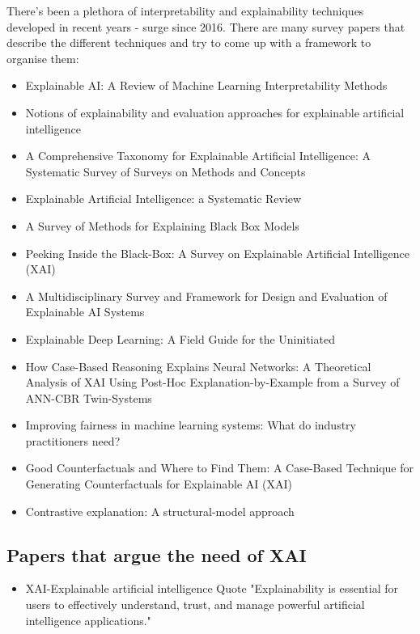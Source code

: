 \documentclass[manuscript,screen,review]{acmart}
\begin{document}
There's been a plethora of interpretability and explainability techniques developed in recent years - surge since 2016. There are many survey papers that describe the different techniques and try to come up with a framework to organise them:
\begin{itemize}
    \item Explainable AI: A Review of Machine Learning Interpretability Methods\cite{Linardatos2021}
    \item Notions of explainability and evaluation approaches for explainable artificial intelligence\cite{Vilone2021}
    \item A Comprehensive Taxonomy for Explainable Artificial Intelligence: A Systematic Survey of Surveys on Methods and Concepts\cite{Schwalbe2021}
    \item Explainable Artificial Intelligence: a Systematic Review\cite{Vilone2020}
    \item A Survey of Methods for Explaining Black Box Models\cite{Guidotti2018a}
    \item Peeking Inside the Black-Box: A Survey on Explainable Artificial Intelligence (XAI)\cite{Adadi2018}
    \item A Multidisciplinary Survey and Framework for Design and Evaluation of Explainable AI Systems\cite{Mohseni2021}
    \item Explainable Deep Learning: A Field Guide for the Uninitiated\cite{Ras2020}
    \item How Case-Based Reasoning Explains Neural Networks: A Theoretical Analysis of XAI Using Post-Hoc Explanation-by-Example from a Survey of ANN-CBR Twin-Systems\cite{Keane2019}
    \item Improving fairness in machine learning systems: What do industry practitioners need?\cite{Holstein2019}
    \item Good Counterfactuals and Where to Find Them: A Case-Based Technique for Generating Counterfactuals for Explainable AI (XAI)\cite{Keane2020} 
    \item Contrastive explanation: A structural-model approach\cite{Miller2021}
\end{itemize}

\subsection{Papers that argue the need of XAI}
\begin{itemize}
    \item XAI-Explainable artificial intelligence\cite{Gunning2019} Quote "Explainability is essential for users to effectively understand, trust, and manage powerful artificial intelligence applications."
\end{itemize}
\end{document}
